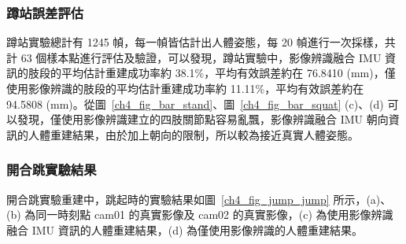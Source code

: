 \subsubsection*{蹲站誤差評估}
蹲站實驗總計有 1245 幀，每一幀皆估計出人體姿態，每 20 幀進行一次採樣，共計 63 個樣本點進行評估及驗證，可以發現，蹲站實驗中，影像辨識融合 IMU 資訊的肢段的平均估計重建成功率約 38.1\%，平均有效誤差約在 76.8410 (mm)，僅使用影像辨識的肢段的平均估計重建成功率約 11.11\%，平均有效誤差約在 94.5808 (mm)。從圖~\ref{ch4_fig_bar_stand}、圖~\ref{ch4_fig_bar_squat} (c)、(d) 可以發現，僅使用影像辨識建立的四肢關節點容易亂飄，影像辨識融合 IMU 朝向資訊的人體重建結果，由於加上朝向的限制，所以較為接近真實人體姿態。

\clearpage

\subsubsection*{開合跳實驗結果}
開合跳實驗重建中，跳起時的實驗結果如圖~\ref{ch4_fig_jump_jump} 所示，(a)、(b) 為同一時刻點 cam01 的真實影像及 cam02 的真實影像，(c) 為使用影像辨識融合 IMU 資訊的人體重建結果，(d) 為僅使用影像辨識的人體重建結果。

